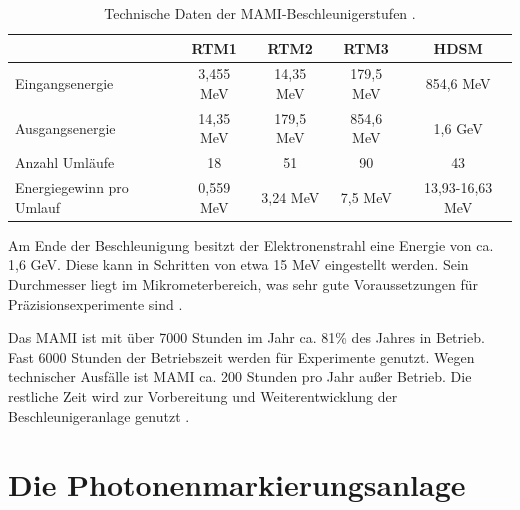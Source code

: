 \documentclass[a4paper,11pt,oneside,final,german,openbib,pdftex]{scrbook}
\begin{document}
{\begin{table}[h!]
		\begin{tabular}{p{3cm}cccc}
		
			& RTM1 & RTM2 & RTM3 & HDSM \\

			\hline
			Eingangsenergie &3,455 MeV  &  14,35 MeV& 179,5 MeV  &854,6 MeV \\
			Ausgangsenergie &14,35 MeV  &  179,5 MeV &854,6 MeV  & 1,6 GeV \\ 
			Anzahl Uml\"aufe&18  &51  &90  &43 \\ 
			Energiegewinn  
			pro Umlauf &0,559 MeV  & 3,24 MeV & 7,5 MeV  & 13,93-16,63 MeV \\ 
			
	
		\end{tabular}

		\caption[Technische Daten der Mamibeschleunigerstufen]{Technische Daten der MAMI-Beschleunigerstufen \cite{Un08}.}
		\label{tab.MAMIstufen}

\end{table}

 Am Ende der Beschleunigung besitzt der Elektronenstrahl eine Energie von ca. 1,6 GeV. Diese kann in Schritten von etwa 15 MeV eingestellt werden. Sein Durchmesser liegt im Mikrometerbereich, was sehr gute Voraussetzungen f\"ur Pr\"azisionsexperimente sind \cite{KPh07}. 
 
 Das MAMI ist mit \"uber 7000 Stunden im Jahr ca. 81\% des Jahres in Betrieb. Fast 6000 Stunden der Betriebszeit werden f\"ur Experimente genutzt. Wegen technischer Ausf\"alle ist MAMI ca. 200 Stunden pro Jahr au{\ss}er Betrieb. Die restliche Zeit wird zur Vorbereitung und Weiterentwicklung der Beschleunigeranlage genutzt \cite{KPh11B}.
 
 
 \section{Die Photonenmarkierungsanlage}
 
}
\end{document}
